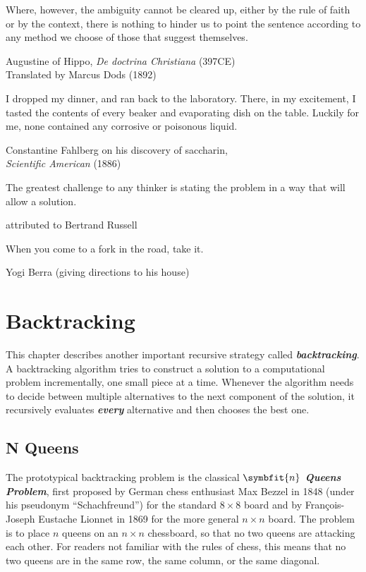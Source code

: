 \epigraph{Where, however, the ambiguity cannot be cleared up, either by the rule of faith or by the context, there is nothing to hinder us to point the sentence according to any method we choose of those that suggest themselves.}{Augustine of Hippo, \textit{De doctrina Christiana} (397CE)\\Translated by Marcus Dods (1892)}

\epigraph{I dropped my dinner, and ran back to the laboratory. There, in my excitement, I tasted the contents of every beaker and evaporating dish on the table. Luckily for me, none contained any corrosive or poisonous liquid.}{Constantine Fahlberg on his discovery of saccharin,\\\textit{Scientific American} (1886)}

\epigraph{The greatest challenge to any thinker is stating the problem in a way that will allow a solution.}{attributed to Bertrand Russell}

\epigraph{When you come to a fork in the road, take it.}{Yogi Berra (giving directions to his house)}

\chapter{Backtracking}
\label{ch:2}

This chapter describes another important recursive strategy called \textbf{\textit{backtracking}}.
A backtracking algorithm tries to construct a solution to a computational problem incrementally, one small piece at a time.
Whenever the algorithm needs to decide between multiple alternatives to the next component of the solution, it recursively evaluates \textbf{\textit{every}} alternative and then chooses the best one.

\section{N Queens}
\label{sec:2.1}

The prototypical backtracking problem is the classical \textbf{\textit{$\symbfit{n}$ Queens Problem}}, first proposed by German chess enthusiast Max Bezzel in 1848 (under his pseudonym “Schachfreund”) for the standard $8 \times 8$ board and by François-Joseph Eustache Lionnet in 1869 for the more general $n \times n$ board.
The problem is to place $n$ queens on an $n \times n$ chessboard, so that no two queens are attacking each other.
For readers not familiar with the rules of chess, this means that no two queens are in the same row, the same column, or the same diagonal.

